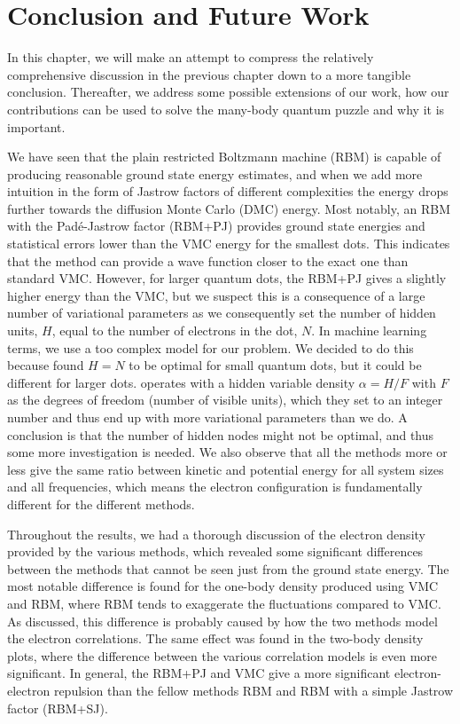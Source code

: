\chapter{Conclusion and Future Work} \label{sec:conclusion}
In this chapter, we will make an attempt to compress the relatively comprehensive discussion in the previous chapter down to a more tangible conclusion. Thereafter, we address some possible extensions of our work, how our contributions can be used to solve the many-body quantum puzzle and why it is important. 

We have seen that the plain restricted Boltzmann machine (RBM) is capable of producing reasonable ground state energy estimates, and when we add more intuition in the form of Jastrow factors of different complexities the energy drops further towards the diffusion Monte Carlo (DMC) energy. Most notably, an RBM with the Padé-Jastrow  factor (RBM+PJ) provides ground state energies and statistical errors lower than the VMC energy for the smallest dots. This indicates that the method can provide a wave function closer to the exact one than standard VMC. However, for larger quantum dots, the RBM+PJ gives a slightly higher energy than the VMC, but we suspect this is a consequence of a large number of variational parameters as we consequently set the number of hidden units, $H$, equal to the number of electrons in the dot, $N$. In machine learning terms, we use a too complex model for our problem. We decided to do this because \citet{nordhagen_computational_2018} found $H=N$ to be optimal for small quantum dots, but it could be different for larger dots. \citet{carleo_solving_2017} operates with a hidden variable density $\alpha=H/F$ with $F$ as the degrees of freedom (number of visible units), which they set to an integer number and thus end up with more variational parameters than we do. A conclusion is that the number of hidden nodes might not be optimal, and thus some more investigation is needed. We also observe that all the methods more or less give the same ratio between kinetic and potential energy for all system sizes and all frequencies, which means the electron configuration is fundamentally different for the different methods.

Throughout the results, we had a thorough discussion of the electron density provided by the various methods, which revealed some significant differences between the methods that cannot be seen just from the ground state energy. The most notable difference is found for the one-body density produced using VMC and RBM, where RBM tends to exaggerate the fluctuations compared to VMC. As discussed, this difference is probably caused by how the two methods model the electron correlations. The same effect was found in the two-body density plots, where the difference between the various correlation models is even more significant. In general, the RBM+PJ and VMC give a more significant electron-electron repulsion than the fellow methods RBM and RBM with a simple Jastrow factor (RBM+SJ).


